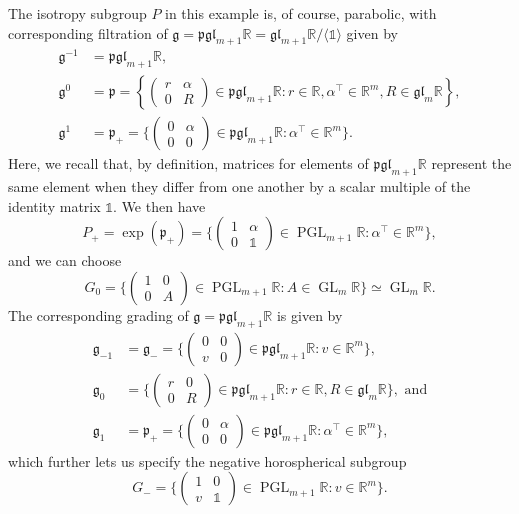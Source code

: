 \documentclass[12pt,a4paper]{amsart}
\theoremstyle{definition}
\DeclareMathOperator{\GLin}{GL}
\DeclareMathOperator{\PGL}{PGL}
\begin{document}
The isotropy subgroup $P$ in this example is, of course, parabolic, with corresponding filtration of $\mathfrak{g}=\mathfrak{pgl}_{m+1}\mathbb{R}=\mathfrak{gl}_{m+1}\mathbb{R}/\langle\mathds{1}\rangle$ given by
\begin{align*}\mathfrak{g}^{-1} & =\mathfrak{pgl}_{m+1}\mathbb{R}, \\
\mathfrak{g}^0 & =\mathfrak{p}=\left\{\begin{pmatrix}r & \alpha \\ 0 & R\end{pmatrix}\in\mathfrak{pgl}_{m+1}\mathbb{R}:r\in\mathbb{R}, \alpha^\top\in\mathbb{R}^m, R\in\mathfrak{gl}_m\mathbb{R}\right\}, \\
\mathfrak{g}^1 & =\mathfrak{p}_+=\{\left(\begin{smallmatrix}0 & \alpha \\ 0 & 0\end{smallmatrix}\right)\in\mathfrak{pgl}_{m+1}\mathbb{R}: \alpha^\top\in\mathbb{R}^m\}.\end{align*}
Here, we recall that, by definition, matrices for elements of $\mathfrak{pgl}_{m+1}\mathbb{R}$ represent the same element when they differ from one another by a scalar multiple of the identity matrix $\mathds{1}$. We then have
\[P_+=\exp(\mathfrak{p}_+)=\{\left(\begin{smallmatrix}1 & \alpha \\ 0 & \mathds{1}\end{smallmatrix}\right)\in\PGL_{m+1}\mathbb{R}:\alpha^\top\in\mathbb{R}^m\},\]
and we can choose
\[G_0=\{\left(\begin{smallmatrix}1 & 0 \\ 0 & A\end{smallmatrix}\right)\in\PGL_{m+1}\mathbb{R}:A\in\GLin_m\mathbb{R}\}\simeq\GLin_m\mathbb{R}.\]
The corresponding grading of $\mathfrak{g}=\mathfrak{pgl}_{m+1}\mathbb{R}$ is given by
\begin{align*}\mathfrak{g}_{-1} & =\mathfrak{g}_-=\{\left(\begin{smallmatrix}0 & 0 \\ v & 0\end{smallmatrix}\right)\in\mathfrak{pgl}_{m+1}\mathbb{R}: v\in\mathbb{R}^m\}, \\
\mathfrak{g}_0 & =\{\left(\begin{smallmatrix}r & 0 \\ 0 & R\end{smallmatrix}\right)\in\mathfrak{pgl}_{m+1}\mathbb{R}:r\in\mathbb{R},R\in\mathfrak{gl}_m\mathbb{R}\},\text{ and} \\
\mathfrak{g}_1 & =\mathfrak{p}_+=\{\left(\begin{smallmatrix}0 & \alpha \\ 0 & 0\end{smallmatrix}\right)\in\mathfrak{pgl}_{m+1}\mathbb{R}:\alpha^\top\in\mathbb{R}^m\},\end{align*}
which further lets us specify the negative horospherical subgroup
\[G_-=\{\left(\begin{smallmatrix}1 & 0 \\ v & \mathds{1}\end{smallmatrix}\right)\in\PGL_{m+1}\mathbb{R}: v\in\mathbb{R}^m\}.\]
\end{document}
